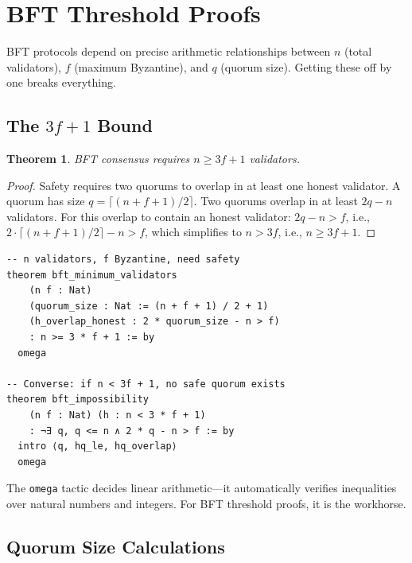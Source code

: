 \documentclass[11pt,a4paper]{article}
\newtheorem{theorem}{Theorem}
\begin{document}
\section{BFT Threshold Proofs}

BFT protocols depend on precise arithmetic relationships between $n$ (total validators),
$f$ (maximum Byzantine), and $q$ (quorum size). Getting these off by one breaks
everything.

\subsection{The $3f + 1$ Bound}

\begin{theorem}
BFT consensus requires $n \geq 3f + 1$ validators.
\end{theorem}

\begin{proof}
Safety requires two quorums to overlap in at least one honest validator. A quorum has
size $q = \lceil (n + f + 1) / 2 \rceil$. Two quorums overlap in at least $2q - n$
validators. For this overlap to contain an honest validator: $2q - n > f$, i.e.,
$2 \cdot \lceil (n + f + 1) / 2 \rceil - n > f$, which simplifies to $n > 3f$, i.e.,
$n \geq 3f + 1$.
\end{proof}

\begin{lstlisting}[language=Lean,caption={$3f + 1$ bound in Lean~4}]
-- n validators, f Byzantine, need safety
theorem bft_minimum_validators
    (n f : Nat)
    (quorum_size : Nat := (n + f + 1) / 2 + 1)
    (h_overlap_honest : 2 * quorum_size - n > f)
    : n >= 3 * f + 1 := by
  omega

-- Converse: if n < 3f + 1, no safe quorum exists
theorem bft_impossibility
    (n f : Nat) (h : n < 3 * f + 1)
    : ¬∃ q, q <= n ∧ 2 * q - n > f := by
  intro ⟨q, hq_le, hq_overlap⟩
  omega
\end{lstlisting}

The \texttt{omega} tactic decides linear arithmetic---it automatically verifies
inequalities over natural numbers and integers. For BFT threshold proofs, it is the
workhorse.

\subsection{Quorum Size Calculations}
\end{document}
